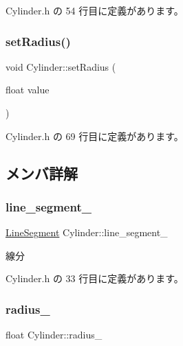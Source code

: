  Cylinder.\+h の 54 行目に定義があります。

\mbox{\label{class_cylinder_a3baa0a5587c54b7a92f170ce52d0f658}} 
\subsubsection{\texorpdfstring{set\+Radius()}{setRadius()}}
{\footnotesize\ttfamily void Cylinder\+::set\+Radius (\begin{DoxyParamCaption}\item[{float}]{value }\end{DoxyParamCaption})\hspace{0.3cm}{\ttfamily [inline]}}



 Cylinder.\+h の 69 行目に定義があります。



\subsection{メンバ詳解}
\mbox{\label{class_cylinder_a29d1c6c61863d19f617287da9474f1c4}} 
\subsubsection{\texorpdfstring{line\+\_\+segment\+\_\+}{line\_segment\_}}
{\footnotesize\ttfamily \mbox{\hyperlink{class_line_segment}{Line\+Segment}} Cylinder\+::line\+\_\+segment\+\_\+\hspace{0.3cm}{\ttfamily [private]}}



線分 



 Cylinder.\+h の 33 行目に定義があります。

\mbox{\label{class_cylinder_abba752e07b11b7bfd8fcce64a6d9b678}} 
\subsubsection{\texorpdfstring{radius\+\_\+}{radius\_}}
{\footnotesize\ttfamily float Cylinder\+::radius\+\_\+\hspace{0.3cm}{\ttfamily [private]}}



